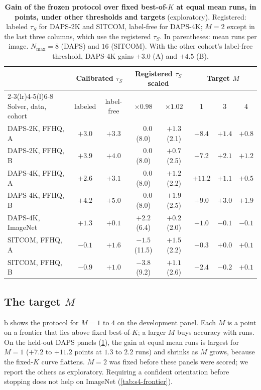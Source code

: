 \begin{table}[h]
\centering\small
\setlength{\tabcolsep}{3.5pt}
\begin{tabular}{@{}l cc cc ccc@{}}
\toprule
 & \multicolumn{2}{c}{Calibrated $\tau_S$} & \multicolumn{2}{c}{Registered $\tau_S$ scaled} & \multicolumn{3}{c}{Target $M$} \\
\cmidrule(lr){2-3}\cmidrule(lr){4-5}\cmidrule(l){6-8}
Solver, data, cohort & labeled & label-free & $\times0.98$ & $\times1.02$ & 1 & 3 & 4 \\
\midrule
DAPS-2K, FFHQ, A & $+3.0$ & $+3.3$ & $\phantom{+}0.0$ (8.0) & $+1.3$ (2.1) & $+8.4$ & $+1.4$ & $+0.8$ \\
DAPS-2K, FFHQ, B & $+3.9$ & $+4.0$ & $\phantom{+}0.0$ (8.0) & $+0.7$ (2.5) & $+7.2$ & $+2.1$ & $+1.2$ \\
DAPS-4K, FFHQ, A & $+2.6$ & $+3.1$ & $\phantom{+}0.0$ (8.0) & $+1.2$ (2.2) & $+11.2$ & $+1.1$ & $+0.5$ \\
DAPS-4K, FFHQ, B & $+4.2$ & $+5.0$ & $\phantom{+}0.0$ (8.0) & $+1.9$ (2.5) & $+9.0$ & $+3.0$ & $+1.9$ \\
DAPS-4K, ImageNet & $+1.3$ & $+0.1$ & $+2.2$ (6.4) & $+0.2$ (2.0) & $+1.0$ & $-0.1$ & $-0.1$ \\
SITCOM, FFHQ, A & $-0.1$ & $+1.6$ & $-1.5$ (11.5) & $+1.5$ (2.2) & $-0.3$ & $+0.0$ & $+0.1$ \\
SITCOM, FFHQ, B & $-0.9$ & $+1.0$ & $-3.8$ (9.2) & $+1.1$ (2.6) & $-2.4$ & $-0.2$ & $+0.1$ \\
\bottomrule
\end{tabular}
\caption{\textbf{Gain of the frozen protocol over fixed best-of-$K$ at equal mean runs, in points, under other thresholds and targets} (exploratory). Registered: labeled $\tau_S$ for DAPS-2K and SITCOM, label-free for DAPS-4K; $M=2$ except in the last three columns, which use the registered $\tau_S$. In parentheses: mean runs per image. $N_{\max}=8$ (DAPS) and $16$ (SITCOM). With the other cohort's label-free threshold, DAPS-4K gains $+3.0$ (A) and $+4.5$ (B).}
\label{tab:suppl-tauacc}
\end{table}

\subsection{The target $M$}
\label{sec:suppl-M}
b shows the protocol for $M=1$ to $4$ on the development panel.
Each $M$ is a point on a frontier that lies above fixed best-of-$K$; a larger $M$ buys accuracy with runs.
On the held-out DAPS panels (\cref{tab:suppl-tauacc}), the gain at equal mean runs is largest for $M=1$ ($+7.2$ to $+11.2$ points at $1.3$ to $2.2$ runs) and shrinks as $M$ grows, because the fixed-$K$ curve flattens.
$M=2$ was fixed before these panels were scored; we report the others as exploratory.
Requiring a confident orientation before stopping does not help on ImageNet (\cref{tab:s4-frontier}).

